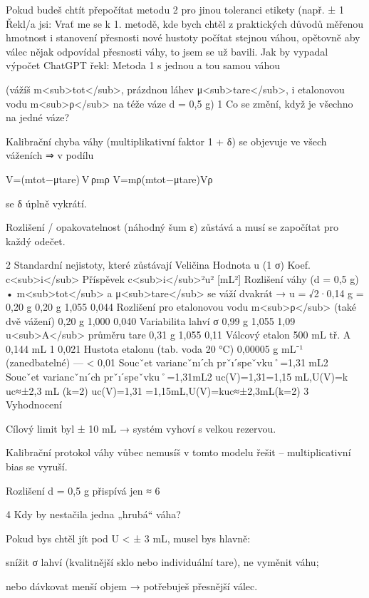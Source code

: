 {Pokud budeš chtít přepočítat metodu 2 pro jinou toleranci etikety (např. ± 1 %
Řekl/a jsi:
Vrať me se k 1. metodě, kde bych chtěl z praktických důvodů měřenou hmotnost i stanovení přesnosti nové hustoty počítat stejnou váhou, opětovně aby válec nějak odpovídal přesnosti váhy, to jsem se už bavili. Jak by vypadal výpočet
ChatGPT řekl:
Metoda 1 s jednou a tou samou váhou

(vážíš m<sub>tot</sub>, prázdnou láhev μ<sub>tare</sub>, i etalonovou vodu m<sub>ρ</sub> na téže váze d = 0,5 g)
1 Co se změní, když je všechno na jedné váze?

    Kalibrační chyba váhy (multiplikativní faktor 1 + δ) se objevuje ve všech váženích ⇒ v podílu

V=(mtot−μtare) V ⁣ρmρ
V=mρ​(mtot​−μtare​)Vρ​​

se δ úplně vykrátí.

    Rozlišení / opakovatelnost (náhodný šum ε) zůstává a musí se započítat pro každý odečet.

2 Standardní nejistoty, které zůstávají
Veličina	Hodnota	u (1 σ)	Koef. c<sub>i</sub>	Příspěvek c<sub>i</sub>²u² [mL²]
Rozlišení váhy (d = 0,5 g)
• m<sub>tot</sub> a μ<sub>tare</sub> se váží dvakrát → u = √2·0,14 g = 0,20 g	0,20 g	1,055	0,044	
Rozlišení pro etalonovou vodu m<sub>ρ</sub> (také dvě vážení)	0,20 g	1,000	0,040	
Variabilita lahví σ	0,99 g	1,055	1,09	
u<sub>A</sub> průměru tare	0,31 g	1,055	0,11	
Válcový etalon 500 mL tř. A	0,144 mL	1	0,021	
Hustota etalonu (tab. voda 20 °C)	0,00005 g mL⁻¹ (zanedbatelné)	—	< 0,01	
Soucˇet variancˇnıˊch prˇıˊspeˇvku˚=1,31  mL2
Soucˇet variancˇnıˊch prˇıˊspeˇvku˚=1,31mL2
uc(V)=1,31=1,15  mL,U(V)=k uc≈±2,3  mL  (k=2)
uc​(V)=1,31
​=1,15mL,U(V)=kuc​≈±2,3mL(k=2)​
3 Vyhodnocení

    Cílový limit byl ± 10 mL → systém vyhoví s velkou rezervou.

    Kalibrační protokol váhy vůbec nemusíš v tomto modelu řešit – multiplicativní bias se vyruší.

    Rozlišení d = 0,5 g přispívá jen ≈ 6 %

4 Kdy by nestačila jedna „hrubá“ váha?

    Pokud bys chtěl jít pod U < ± 3 mL, musel bys hlavně:

        snížit σ lahví (kvalitnější sklo nebo individuální tare), ne vyměnit váhu;

        nebo dávkovat menší objem → potřebuješ přesnější válec.

}
